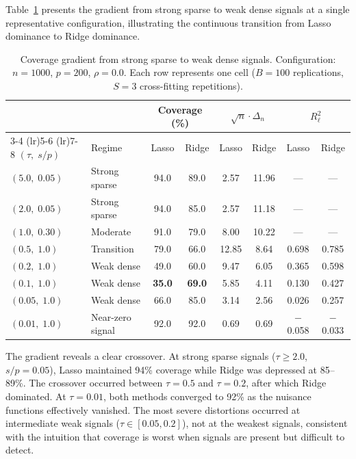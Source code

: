 \documentclass[a4paper,10.5pt]{article}
\begin{document}
Table~\ref{tab:gradient} presents the gradient from strong sparse to weak dense signals at a single representative configuration, illustrating the continuous transition from Lasso dominance to Ridge dominance.

\begin{table}[H]
\centering
\small
\caption{Coverage gradient from strong sparse to weak dense signals. Configuration: $n = 1000$, $p = 200$, $\rho = 0.0$. Each row represents one cell ($B = 100$ replications, $S = 3$ cross-fitting repetitions).}
\label{tab:gradient}
\begin{tabular}{llcccccc}
\toprule
& & \multicolumn{2}{c}{Coverage (\%)} & \multicolumn{2}{c}{$\sqrt{n}\cdot\Delta_n$} & \multicolumn{2}{c}{$R^2_\ell$} \\
\cmidrule(lr){3-4} \cmidrule(lr){5-6} \cmidrule(lr){7-8}
$(\tau,\; s/p)$ & Regime & Lasso & Ridge & Lasso & Ridge & Lasso & Ridge \\
\midrule
$(5.0,\; 0.05)$ & Strong sparse    & 94.0 & 89.0 & 2.57 & 11.96 & --- & --- \\
$(2.0,\; 0.05)$ & Strong sparse    & 94.0 & 85.0 & 2.57 & 11.18 & --- & --- \\
$(1.0,\; 0.30)$ & Moderate         & 91.0 & 79.0 & 8.00 & 10.22 & --- & --- \\
$(0.5,\; 1.0)$  & Transition       & 79.0 & 66.0 & 12.85 & 8.64 & 0.698 & 0.785 \\
$(0.2,\; 1.0)$  & Weak dense       & 49.0 & 60.0 & 9.47 & 6.05 & 0.365 & 0.598 \\
$(0.1,\; 1.0)$  & Weak dense       & \textbf{35.0} & \textbf{69.0} & 5.85 & 4.11 & 0.130 & 0.427 \\
$(0.05,\; 1.0)$ & Weak dense       & 66.0 & 85.0 & 3.14 & 2.56 & 0.026 & 0.257 \\
$(0.01,\; 1.0)$ & Near-zero signal & 92.0 & 92.0 & 0.69 & 0.69 & $-$0.058 & $-$0.033 \\
\bottomrule
\end{tabular}
\end{table}

The gradient reveals a clear crossover. At strong sparse signals ($\tau \geq 2.0$, $s/p = 0.05$), Lasso maintained 94\% coverage while Ridge was depressed at 85--89\%. The crossover occurred between $\tau = 0.5$ and $\tau = 0.2$, after which Ridge dominated. At $\tau = 0.01$, both methods converged to 92\% as the nuisance functions effectively vanished. The most severe distortions occurred at intermediate weak signals ($\tau \in [0.05, 0.2]$), not at the weakest signals, consistent with the intuition that coverage is worst when signals are present but difficult to detect.
\end{document}
